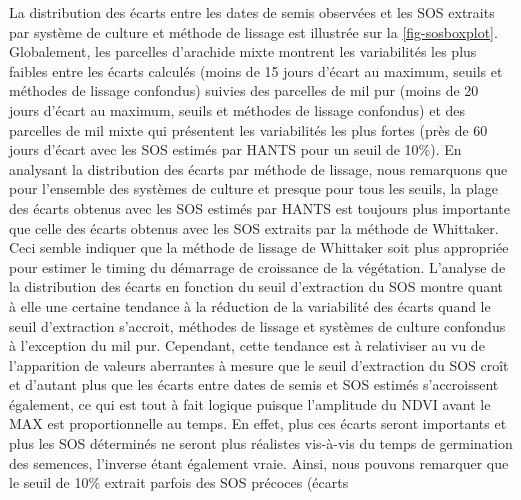 La distribution des écarts entre les dates de semis observées et les SOS extraits par système de culture et méthode de lissage est illustrée sur la \cref{fig-sosboxplot}. Globalement, les parcelles d'arachide mixte montrent les variabilités les plus faibles entre les écarts calculés (moins de 15 jours d'écart au maximum, seuils et méthodes de lissage confondus) suivies des parcelles de mil pur (moins de 20 jours d'écart au maximum, seuils et méthodes de lissage confondus) et des parcelles de mil mixte qui présentent les variabilités les plus fortes (près de 60 jours d'écart avec les SOS estimés par HANTS pour un seuil de 10\%). En analysant la distribution des écarts par méthode de lissage, nous remarquons que pour l'ensemble des systèmes de culture et presque pour tous les seuils, la plage des écarts obtenus avec les SOS estimés par HANTS est toujours plus importante que celle des écarts obtenus avec les SOS extraits par la méthode de Whittaker. Ceci semble indiquer que la méthode de lissage de Whittaker soit plus appropriée pour estimer le timing du démarrage de croissance de la végétation. L'analyse de la distribution des écarts en fonction du seuil d'extraction du SOS montre quant à elle une certaine tendance à la réduction de la variabilité des écarts quand le seuil d'extraction s'accroit, méthodes de lissage et systèmes de culture confondus à l'exception du mil pur. Cependant, cette tendance est à relativiser au vu de l'apparition de valeurs aberrantes à mesure que le seuil d'extraction du SOS croît et d'autant plus que les écarts entre dates de semis et SOS estimés s'accroissent également, ce qui est tout à fait logique puisque l'amplitude du NDVI avant le MAX est proportionnelle au temps. En effet, plus ces écarts seront importants et plus les SOS déterminés ne seront plus réalistes vis-à-vis du temps de germination des semences, l'inverse étant également vraie. 
Ainsi, nous pouvons remarquer que le seuil de 10\% extrait parfois des SOS précoces (écarts 
